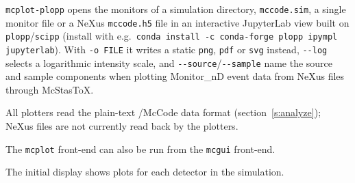 \verb+mcplot-plopp+ opens the monitors of a simulation directory, \texttt{mccode.sim}, a single
monitor file or a NeXus \texttt{mccode.h5} file in an interactive JupyterLab view built on
\texttt{plopp}/\texttt{scipp} (install with e.g.\ \texttt{conda install -c conda-forge plopp
ipympl jupyterlab}). With \verb+-o FILE+ it writes a static \texttt{png}, \texttt{pdf} or
\texttt{svg} instead, \verb+--log+ selects a logarithmic intensity scale, and
\verb+--source+/\verb+--sample+ name the source and sample components when plotting
Monitor\_nD event data from NeXus files through McStasToX.

All plotters read the plain-text \MCS/McCode data format (section~\ref{s:analyze});
NeXus files are not currently read back by the plotters.

The \verb+mcplot+ front-end can also be run from the \verb+mcgui+ front-end.

The initial display shows plots for each detector in the simulation.

